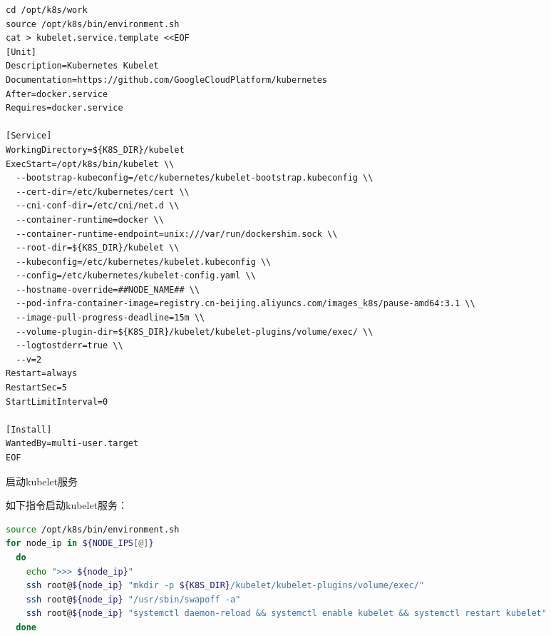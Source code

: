 \documentclass[8pt]{book}
\makeatletter
\numberwithin{dummy}{section}
\theoremstyle{ocrenumbox}
\theoremstyle{blacknumex}
\theoremstyle{blacknumbox}
\theoremstyle{ocrenum}
\renewcommand{\subsubsection}{\@startsection {subsubsection}{3}{\z@}
	{-2ex \@plus -0.1ex \@minus -.2ex}
	{.2ex \@plus.2ex }
	{\normalfont\small\sffamily\bfseries}}
\makeatother
\begin{document}
\begin{lstlisting}
cd /opt/k8s/work
source /opt/k8s/bin/environment.sh
cat > kubelet.service.template <<EOF
[Unit]
Description=Kubernetes Kubelet
Documentation=https://github.com/GoogleCloudPlatform/kubernetes
After=docker.service
Requires=docker.service

[Service]
WorkingDirectory=${K8S_DIR}/kubelet
ExecStart=/opt/k8s/bin/kubelet \\
  --bootstrap-kubeconfig=/etc/kubernetes/kubelet-bootstrap.kubeconfig \\
  --cert-dir=/etc/kubernetes/cert \\
  --cni-conf-dir=/etc/cni/net.d \\
  --container-runtime=docker \\
  --container-runtime-endpoint=unix:///var/run/dockershim.sock \\
  --root-dir=${K8S_DIR}/kubelet \\
  --kubeconfig=/etc/kubernetes/kubelet.kubeconfig \\
  --config=/etc/kubernetes/kubelet-config.yaml \\
  --hostname-override=##NODE_NAME## \\
  --pod-infra-container-image=registry.cn-beijing.aliyuncs.com/images_k8s/pause-amd64:3.1 \\
  --image-pull-progress-deadline=15m \\
  --volume-plugin-dir=${K8S_DIR}/kubelet/kubelet-plugins/volume/exec/ \\
  --logtostderr=true \\
  --v=2
Restart=always
RestartSec=5
StartLimitInterval=0

[Install]
WantedBy=multi-user.target
EOF
\end{lstlisting}

\subsubsection{启动kubelet服务}

如下指令启动kubelet服务：

\begin{lstlisting}[language=Bash]
source /opt/k8s/bin/environment.sh
for node_ip in ${NODE_IPS[@]}
  do
    echo ">>> ${node_ip}"
    ssh root@${node_ip} "mkdir -p ${K8S_DIR}/kubelet/kubelet-plugins/volume/exec/"
    ssh root@${node_ip} "/usr/sbin/swapoff -a"
    ssh root@${node_ip} "systemctl daemon-reload && systemctl enable kubelet && systemctl restart kubelet"
  done
\end{lstlisting}
\end{document}
